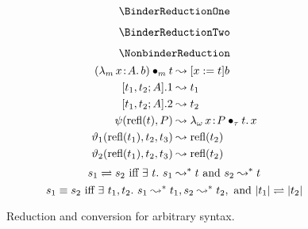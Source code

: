 
\begin{figure}
    \centering
    \begin{minipage}{0.5\textwidth}
        $$\BinderReductionOne$$
    \end{minipage}%
    \begin{minipage}{0.5\textwidth}
        $$\BinderReductionTwo$$
    \end{minipage}%
    $$\NonbinderReduction$$
    \begin{align*}
        ({\lambda_m}\, x\! : \! A.\, b) \bullet_{m} t &\leadsto [x := t]b \\
        [t_1, t_2; A].1 &\leadsto t_1 \\
        [t_1, t_2; A].2 &\leadsto t_2 \\
        \psi(\text{refl}(t),P) &\leadsto {\lambda_\omega}\, x\! : \! P \bullet_{\tau} t.\, x \\
        \vartheta_1(\text{refl}(t_1), t_2, t_3) &\leadsto \text{refl}(t_2) \\
        \vartheta_2(\text{refl}(t_1), t_2, t_3) &\leadsto \text{refl}(t_2) \\
    \end{align*}
    $$s_1 \rightleftharpoons s_2 \text{ iff } \exists\ t.\ s_1 \leadsto^* t \text{ and } s_2 \leadsto^* t$$
    $$s_1 \equiv s_2 \text{ iff } \exists\ t_1, t_2.\ s_1 \leadsto^* t_1, s_2 \leadsto^* t_2, \text{ and } |t_1| \rightleftharpoons |t_2|$$
    \caption{Reduction and conversion for arbitrary syntax.}
\end{figure}


